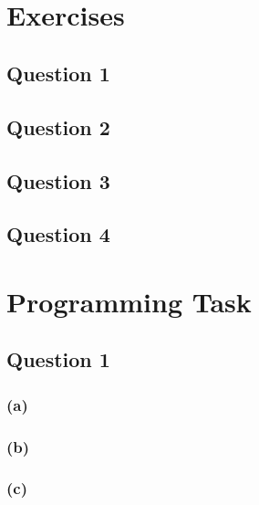 \documentclass[12pt,a4paper,fleqn]{article}
\begin{document}
\title{\Module\\\Uebung}
\author{\Studentenname}
\maketitle

\section*{Exercises} 
\label{sec:exercises}

\subsection*{Question 1}
\label{sec:eq1}

\subsection*{Question 2}
\label{sec:eq2}

\subsection*{Question 3}
\label{sec:eq3}

\subsection*{Question 4}
\label{sec:eq4}

\section*{Programming Task} 
\label{sec:programming}

\subsection*{Question 1}
\label{sec:pq1}


\subsubsection*{(a)}

\subsubsection*{(b)}

\subsubsection*{(c)}
\end{document}
